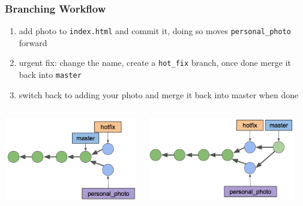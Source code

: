 \documentclass[12pt]{beamer}
\begin{document}
\begin{frame}
\frametitle{Branching Workflow}
\begin{enumerate}
	\item add photo to \texttt{index.html} and commit it, doing so moves \texttt{personal\_photo} forward
	\item urgent fix: change the name, create a \texttt{hot\_fix} branch, once done merge it back into \texttt{master}
	\item switch back to adding your photo and merge it back into master when done
\end{enumerate}
\begin{columns}
	\begin{column}{0.33\linewidth}
		\includegraphics[width=\linewidth]{branch_2}
	\end{column}
	\begin{column}{0.33\linewidth}
		\includegraphics[width=\linewidth]{branch_3}
	\end{column}
	\begin{column}{0.33\linewidth}

\end{column}
\end{columns}
\end{frame}
\end{document}
